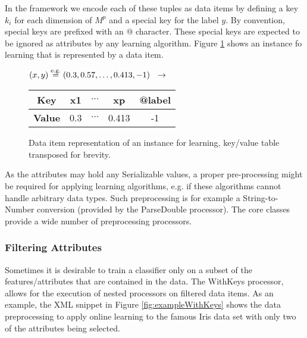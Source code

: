 In the \streams framework we encode each of these tuples as data
items by defining a key $k_i$ for each dimension of $M^p$ and a
special key for the label $y$. By convention, special keys are
prefixed with an {\ttfamily @} character. These special keys are
expected to be ignored as attributes by any learning algorithm.
Figure \ref{fig:exampleItem} shows an instance fo learning that
is represented by a data item.

\begin{figure}[h!]
  \centering
$(x,y) \stackrel{\mbox{\scriptsize e.g.}}{=} (0.3,0.57,\ldots,0.413,-1) \ \ \rightarrow\ \  $ {\footnotesize \begin{tabular}{c|c|c|c|c}
{\bf \textsf{Key}} & {\ttfamily x1} & $\cdots$ & {\ttfamily xp} & {\ttfamily @label} \\ \hline
{\bf \textsf{Value}} & 0.3 & $\cdots$ & 0.413 & -1
\end{tabular}}
  \caption{\label{fig:exampleItem}Data item representation of an instance for learning, key/value table transposed for brevity.}
\end{figure}

As the attributes may hold any {\ttfamily Serializable} values, a
proper pre-processing might be required for applying learning
algorithms, e.g. if these algorithms cannot handle arbitrary data
types. Such preprocessing is for example a String-to-Number conversion
(provided by the {\ttfamily ParseDouble} processor). The \streams
core classes provide a wide number of preprocessing processors.

\subsubsection*{Filtering Attributes}
Sometimes it is desirable to train a classifier only on a subset of
the features/attributes that are contained in the data. The {\ttfamily WithKeys}
processor, allows for the execution of nested processors on filtered
data items. As an example, the XML snippet in Figure \ref{fig:exampleWithKeys}
shows the data preprocessing to apply online learning to the famous Iris
data set with only two of the attributes being selected.

